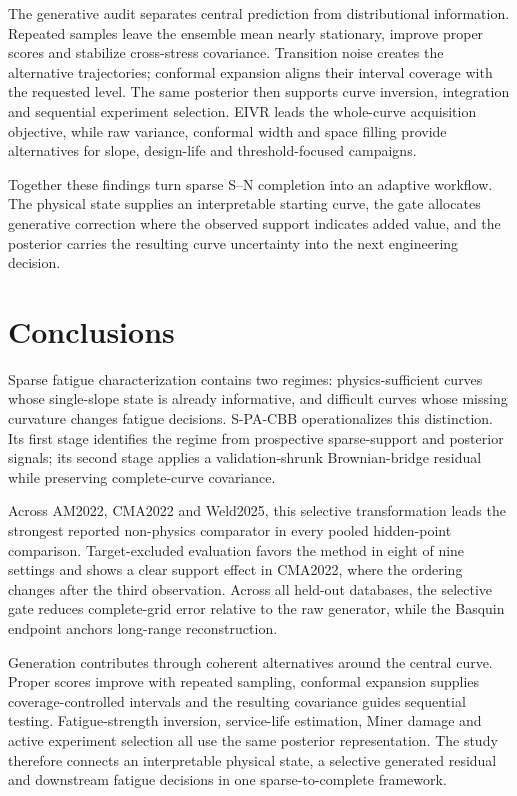 \documentclass[a4paper,fleqn]{cas-dc}
\newcommand{\method}{S-PA-CBB}
\begin{document}
The generative audit separates central prediction from distributional information. Repeated samples leave the ensemble mean nearly stationary, improve proper scores and stabilize cross-stress covariance. Transition noise creates the alternative trajectories; conformal expansion aligns their interval coverage with the requested level. The same posterior then supports curve inversion, integration and sequential experiment selection. EIVR leads the whole-curve acquisition objective, while raw variance, conformal width and space filling provide alternatives for slope, design-life and threshold-focused campaigns.

Together these findings turn sparse S--N completion into an adaptive workflow. The physical state supplies an interpretable starting curve, the gate allocates generative correction where the observed support indicates added value, and the posterior carries the resulting curve uncertainty into the next engineering decision.

\section{Conclusions}

Sparse fatigue characterization contains two regimes: physics-sufficient curves whose single-slope state is already informative, and difficult curves whose missing curvature changes fatigue decisions. \method{} operationalizes this distinction. Its first stage identifies the regime from prospective sparse-support and posterior signals; its second stage applies a validation-shrunk Brownian-bridge residual while preserving complete-curve covariance.

Across AM2022, CMA2022 and Weld2025, this selective transformation leads the strongest reported non-physics comparator in every pooled hidden-point comparison. Target-excluded evaluation favors the method in eight of nine settings and shows a clear support effect in CMA2022, where the ordering changes after the third observation. Across all held-out databases, the selective gate reduces complete-grid error relative to the raw generator, while the Basquin endpoint anchors long-range reconstruction.

Generation contributes through coherent alternatives around the central curve. Proper scores improve with repeated sampling, conformal expansion supplies coverage-controlled intervals and the resulting covariance guides sequential testing. Fatigue-strength inversion, service-life estimation, Miner damage and active experiment selection all use the same posterior representation. The study therefore connects an interpretable physical state, a selective generated residual and downstream fatigue decisions in one sparse-to-complete framework.
\end{document}

